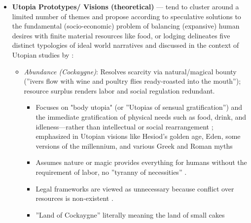 \documentclass[jou,floatsintext]{apa7}
\begin{document}
\begin{itemize}
    \vspace{0.1cm}
        \hrulefill
    \vspace{0.1cm}

    \item \textbf{Utopia Prototypes/ Visions (theoretical)} --- tend to cluster around a limited number of themes and propose according to \cite{davisUtopiaIdealSociety1983} speculative solutions to the fundamental (socio-economic) problem of balancing (expansive) human desires with finite material resources like food, or lodging delineates five distinct typologies of ideal world narratives \parencite[see also][]{bruceThreeEarlyModern2009} and discussed in the context of Utopian studies by \cite{fernandoProfilesIdealSociety2023, kashimaCollectiveFutureThinking2025}:

\begin{itemize}
    \item \textit{Abundance (Cockaygne)}: Resolves scarcity via natural/magical bounty (''ivers flow with wine and poultry flies ready-roasted into the mouth''); resource surplus renders labor and social regulation redundant.
    \begin{itemize}
        \item Focuses on "body utopia" (or ''Utopias of sensual gratification'') and the immediate gratification of physical needs such as food, drink, and idleness---rather than intellectual or social rearrangement \parencite{aviles14LawBasedUtopia2001}; emphasized in Utopian visions like Hesiod's golden age, Eden, some versions of the millennium, and various Greek and Roman myths \parencite{sargentThreeFacesUtopianism1994}
        \item Assumes nature or magic provides everything for humans without the requirement of labor, no ''tyranny of necessities'' \parencite{aviles14LawBasedUtopia2001, pohlUtopianismMoreRenaissance2010}.
        \item Legal frameworks are viewed as unnecessary because conflict over resources is non-existent \parencite{aviles14LawBasedUtopia2001}.
        \item ''Land of Cockaygne'' literally meaning the land of small cakes \parencite{pohlUtopianismMoreRenaissance2010}
    \end{itemize}


\end{itemize}
\end{itemize}
\end{document}
